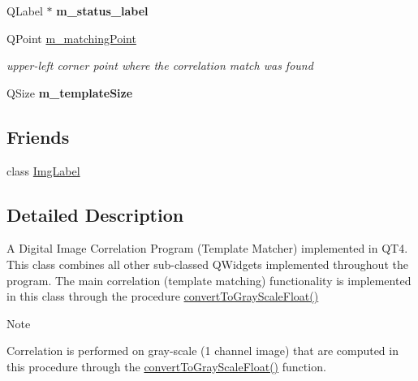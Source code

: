 \begin{DoxyCompactItemize}
\item 
\hypertarget{classQcorr_a1bf4a70aa6c4e171f2e0613109bb57e9}{
QLabel $\ast$ {\bfseries m\_\-status\_\-label}}
\label{classQcorr_a1bf4a70aa6c4e171f2e0613109bb57e9}

\item 
\hypertarget{classQcorr_a8a7f00160ae46441cef038149cf28bdc}{
QPoint \hyperlink{classQcorr_a8a7f00160ae46441cef038149cf28bdc}{m\_\-matchingPoint}}
\label{classQcorr_a8a7f00160ae46441cef038149cf28bdc}

\begin{DoxyCompactList}\small\item\em upper-\/left corner point where the correlation match was found \item\end{DoxyCompactList}\item 
\hypertarget{classQcorr_abc48bdd2110cfdaf7b98dde1cdf42f18}{
QSize {\bfseries m\_\-templateSize}}
\label{classQcorr_abc48bdd2110cfdaf7b98dde1cdf42f18}

\end{DoxyCompactItemize}
\subsection*{Friends}
\begin{DoxyCompactItemize}
\item 
\hypertarget{classQcorr_a5b4b2caf4c596b601dd096785e4a32b9}{
class \hyperlink{classQcorr_a5b4b2caf4c596b601dd096785e4a32b9}{ImgLabel}}
\label{classQcorr_a5b4b2caf4c596b601dd096785e4a32b9}

\end{DoxyCompactItemize}


\subsection{Detailed Description}
A Digital Image Correlation Program (Template Matcher) implemented in QT4. This class combines all other sub-\/classed QWidgets implemented throughout the program. The main correlation (template matching) functionality is implemented in this class through the procedure \hyperlink{classQcorr_ad1b26ace597c0c4a0f64a0bd9576d4fc}{convertToGrayScaleFloat()}

\begin{DoxyNote}{Note}

\end{DoxyNote}
Correlation is performed on gray-\/scale (1 channel image) that are computed in this procedure through the \hyperlink{classQcorr_ad1b26ace597c0c4a0f64a0bd9576d4fc}{convertToGrayScaleFloat()} function.

